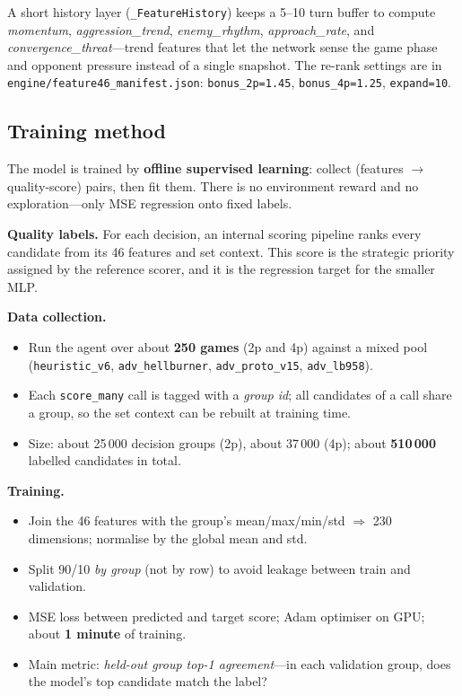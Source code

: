 \documentclass[conference]{IEEEtran}
\begin{document}
A short history layer (\texttt{\_FeatureHistory}) keeps a 5--10 turn buffer to compute \textit{momentum}, \textit{aggression\_trend}, \textit{enemy\_rhythm}, \textit{approach\_rate}, and \textit{convergence\_threat}---trend features that let the network sense the game phase and opponent pressure instead of a single snapshot. The re-rank settings are in \texttt{engine/feature46\_manifest.json}: \texttt{bonus\_2p=1.45}, \texttt{bonus\_4p=1.25}, \texttt{expand=10}.

\subsection{Training method}
\label{sec:training}

The model is trained by \textbf{offline supervised learning}: collect (features $\rightarrow$ quality-score) pairs, then fit them. There is no environment reward and no exploration---only MSE regression onto fixed labels.

\textbf{Quality labels.} For each decision, an internal scoring pipeline ranks every candidate from its 46 features and set context. This score is the strategic priority assigned by the reference scorer, and it is the regression target for the smaller MLP.

\textbf{Data collection.}
\begin{itemize}
\item Run the agent over about \textbf{250 games} (2p and 4p) against a mixed pool (\texttt{heuristic\_v6}, \texttt{adv\_hellburner}, \texttt{adv\_proto\_v15}, \texttt{adv\_lb958}).
\item Each \texttt{score\_many} call is tagged with a \textit{group id}; all candidates of a call share a group, so the set context can be rebuilt at training time.
\item Size: about 25\,000 decision groups (2p), about 37\,000 (4p); about \textbf{510\,000} labelled candidates in total.
\end{itemize}

\textbf{Training.}
\begin{itemize}
\item Join the 46 features with the group's mean/max/min/std $\Rightarrow$ 230 dimensions; normalise by the global mean and std.
\item Split 90/10 \textit{by group} (not by row) to avoid leakage between train and validation.
\item MSE loss between predicted and target score; Adam optimiser on GPU; about \textbf{1 minute} of training.
\item Main metric: \textit{held-out group top-1 agreement}---in each validation group, does the model's top candidate match the label?
\end{itemize}
\end{document}
